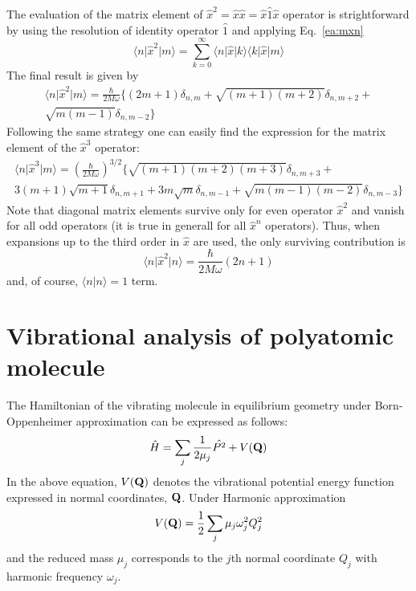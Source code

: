 \documentclass[a4paper,titlepage,twoside,fleqn,12pt]{book}
\begin{document}
\begin{appendices}
The evaluation of the matrix element of $\hat{x}^2=\hat{x}\hat{x}=\hat{x}\hat{1}\hat{x}$ 
operator is strightforward
by using the resolution of identity operator $\hat{1}$ and applying Eq.~\eqref{ea:mxn}
%
\begin{equation}
\langle n \vert \hat{x}^2 \vert m \rangle = 
\sum_{k=0}^{\infty} \langle n \vert \hat{x} \vert k \rangle \langle k \vert \hat{x} \vert m \rangle
\end{equation}
%
The final result is given by
%
\begin{multline}
\label{ea:mxxn}
\langle n \vert \hat{x}^2 \vert m \rangle = 
\frac{\hbar}{2M\omega}
\Big\{ 
   (2m+1) \delta_{n,m} + \sqrt{(m+1)(m+2)} \delta_{n,m+2} + \\
                         \sqrt{m(m-1)} \delta_{n,m-2}
\Big\}
\end{multline}
%
Following the same strategy one can easily find the expression for 
the matrix element of the $\hat{x}^3$ operator:
%
\begin{multline}
\label{ea:mxxxn}
\langle n \vert \hat{x}^3 \vert m \rangle = 
\left(
\frac{\hbar}{2M\omega}
\right)^{3/2}
\Big\{ 
   \sqrt{(m+1)(m+2)(m+3)} \delta_{n,m+3} + \\
   3(m+1)\sqrt{m+1} \delta_{n,m+1}
      +3m\sqrt{m}   \delta_{n,m-1} + \sqrt{m(m-1)(m-2)} \delta_{n,m-3}
\Big\}
\end{multline}
%
Note that diagonal matrix elements survive only for even operator $\hat{x}^2$
and vanish for all odd operators (it is true in generall for all $\hat{x}^n$
operators). Thus, when expansions up to the third order in $\hat{x}$ are 
used, the only surviving contribution is
%
\begin{equation}
\label{ea:mxm}
\langle n \vert \hat{x}^2 \vert n \rangle = 
\frac{\hbar}{2M\omega}(2n+1)
\end{equation}
%
and, of course, $\langle n \vert n \rangle=1$ term.

\section{Vibrational analysis of polyatomic molecule\label{asec:vibranal}}

The Hamiltonian of the vibrating molecule in equilibrium geometry under Born-Oppenheimer approximation
can be expressed as follows:
\begin{equation}
\hat{H} = \sum_j \frac{1}{2\mu_j}\hat{{P}^2} + V({\bf Q})
\end{equation}
In the above equation, $V({\bf Q})$ denotes the vibrational potential energy function
expressed in normal coordinates, ${\bf Q}$. Under Harmonic approximation
\begin{equation}
V({\bf Q}) = \frac{1}{2} \sum_j \mu_j \omega_j^2 Q_j^2
\end{equation}
and the reduced mass $\mu_j$ corresponds to the $j$th normal coordinate $Q_j$ with
harmonic frequency $\omega_j$.


\end{appendices}
\end{document}
